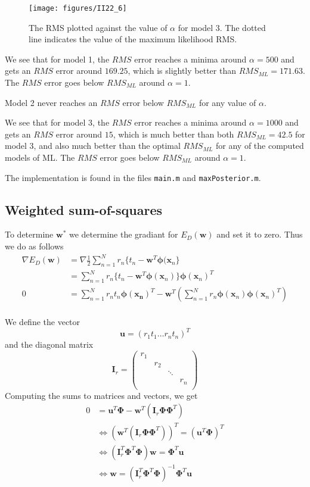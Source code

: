 \documentclass[a4paper, 11pt]{article}
\newcommand{\vect}[1]{\mathbf{#1}}
\newcommand{\mat}[1]{\textbf{#1}}
\begin{document}
\begin{figure}[H]
    \centering
    \texttt{[image: figures/II22\_6]}
    \caption{The RMS plotted against the value of $\alpha$ for model 3. The dotted line indicates the value of the maximum likelihood RMS.}
    \label{fig:II22_6}
\end{figure}

We see that for model 1, the $RMS$ error reaches a minima around $\alpha = 500$ and gets an $RMS$ error around $169.25$, which is slightly better than $RMS_{ML} = 171.63$. The $RMS$ error goes below $RMS_{ML}$ around $\alpha = 1$.

Model 2 never reaches an $RMS$ error below $RMS_{ML}$ for any value of $\alpha$.

We see that for model 3, the $RMS$ error reaches a minima around $\alpha = 1000$ and gets an $RMS$ error around $15$, which is much better than both $RMS_{ML} = 42.5$ for model 3, and also much better than the optimal $RMS_{ML}$ for any of the computed models of ML. The $RMS$ error goes below $RMS_{ML}$ around $\alpha = 1$.

The implementation is found in the files \texttt{main.m} and \texttt{maxPosterior.m}.

\subsection{Weighted sum-of-squares}
To determine $\vect{w}^*$ we determine the gradiant for $E_D(\vect{w})$ and set it to zero. Thus we do as follows
\begin{align*}
    \nabla E_D(\vect{w})
    &= \nabla \frac{1}{2} \sum_{n=1}^{N} r_n \lbrace t_n - \vect{w}^T \bm\phi(\vect{x}_n \rbrace \\
    &= \sum_{n=1}^{N} r_n \lbrace t_n - \vect{w}^T \bm\phi(\vect{x}_n) \rbrace \bm\phi(\vect{x}_n)^T \\
    0
    &= \sum_{n=1}^{N} r_n t_n \bm\phi(\vect{x_n})^T - \vect{w}^T \left( \sum_{n=1}^{N} r_n \bm\phi(\vect{x}_n) \bm\phi(\vect{x}_n)^T \right) \\
\end{align*}

We define the vector
\[
\vect{u} = (r_1t_1 \ldots r_nt_n)^T
\]
and the diagonal matrix
\[
\mat{I}_r = \begin{pmatrix}
    r_1 & & & \\
    & r_2 & & \\
    & & \ddots & \\
    & & & r_n \\
\end{pmatrix}
\]
Computing the sums to matrices and vectors, we get
\begin{align*}
    0 &= \vect{u}^T \bm\Phi - \vect{w}^T (\mat{I}_r \bm\Phi \bm\Phi^T) \\
    &\Leftrightarrow (\vect{w}^T (\mat{I}_r \bm\Phi \bm\Phi^T))^T = (\vect{u}^T \bm\Phi)^T \\
    &\Leftrightarrow (\mat{I}_r^T \bm\Phi^T \bm\Phi) \vect{w} = \bm\Phi^T \vect{u} \\
    &\Leftrightarrow \vect{w} = (\mat{I}_r^T \bm\Phi^T \bm\Phi)^{-1} \bm\Phi^T \vect{u}
\end{align*}
\end{document}

